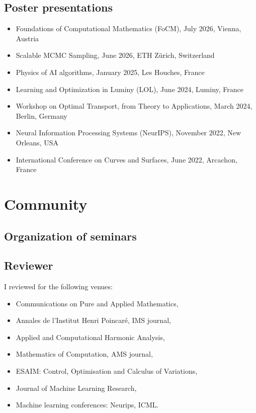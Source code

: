 \documentclass[11pt,a4paper,sans]{moderncv}
\begin{document}
\subsection{Poster presentations}

\begin{itemize}
	\item Foundations of Computational Mathematics (FoCM), July 2026, Vienna, Austria
	\item Scalable MCMC Sampling, June 2026, ETH Zürich, Switzerland
	\item Physics of AI algorithms, January 2025, Les Houches, France
	\item Learning and Optimization in Luminy (LOL), June 2024, Luminy, France
	\item Workshop on Optimal Transport, from Theory to Applications, March 2024, Berlin, Germany
	\item Neural Information Processing Systems (NeurIPS), November 2022, New Orleans, USA
	\item International Conference on Curves and Surfaces, June 2022, Arcachon, France
\end{itemize}

\clearpage

\section{Community}

\subsection{Organization of seminars}



\subsection{Reviewer}
I reviewed for the following venues:
\begin{itemize}
	\item Communications on Pure and Applied Mathematics,
	\item Annales de l'Institut Henri Poincaré, IMS journal,
	\item Applied and Computational Harmonic Analysis,
	\item Mathematics of Computation, AMS journal,
	\item ESAIM: Control, Optimisation and Calculus of Variations,
	\item Journal of Machine Learning Research,
	\item Machine learning conferences: Neurips, ICML.
\end{itemize}
\end{document}
